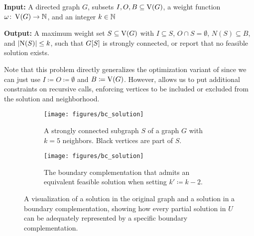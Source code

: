 \begin{theorem}
\begin{tcolorbox}[enhanced,title={\color{black} {\scsrec{}}}, colback=white, boxrule=0.4pt,
	attach boxed title to top left={xshift=.3cm, yshift*=-2.5mm},
	boxed title style={size=small,frame hidden,colback=white}]
	
	\textbf{Input:}  
  A directed graph $G$, subsets $I,O,B \subseteq \operatorname{V}({G})$, a weight function $\operatorname{\omega} \colon \operatorname{V}({G}) \to \mathbb{N}$, and an integer $k \in \mathbb{N}$

	\textbf{Output:} A maximum weight set $S \subseteq \operatorname{V}({G})$ with $I \subseteq S$, $O \cap S = \emptyset$, $N(S) \subseteq B$, and $\abs{\nei{S}} \le k$, such that ${G}[{S}]$ is strongly connected, or report that no feasible solution exists. 
\end{tcolorbox} 

Note that this problem directly generalizes the optimization variant of \scs{} since we can just use $I \coloneqq O \coloneqq \emptyset$ and $B \coloneqq \operatorname{V}({G})$. However, \scsrec{} allows us to put additional constraints on recursive calls, enforcing vertices to be included or excluded from the solution and neighborhood.

\begin{figure}[t]
    \centering
    \hfill
    \begin{subfigure}{0.48\textwidth}
      \centering
      \texttt{[image: figures/bc\_solution]}
      \caption{A strongly connected subgraph $S$ of a graph $G$ with $k=5$ neighbors. Black vertices are part of $S$.}
    \end{subfigure}
    \hfill
    \begin{subfigure}{0.48\textwidth}
      \centering
      \texttt{[image: figures/bc\_solution]}
      \caption{The boundary complementation that admits an equivalent feasible solution when setting $k' \coloneqq k - 2$.}\label{fig:scc_bcb}
    \end{subfigure}
    \hfill
    \caption{A visualization of a solution in the original graph and a solution in a boundary complementation, showing how every partial solution in $U$ can be adequately represented by a specific boundary complementation.}\label{fig:scc_bc}
\end{figure}


\end{theorem}
